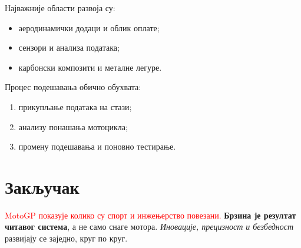 \documentclass[12pt,a4paper]{article}
\begin{document}
Најважније области развоја су:
\begin{itemize}[label=--]
\item аеродинамички додаци и облик оплате;
\item сензори и анализа података;
\item карбонски композити и металне легуре.
\end{itemize}
Процес подешавања обично обухвата:
\begin{enumerate}
\item прикупљање података на стази;
\item анализу понашања мотоцикла;
\item промену подешавања и поновно тестирање.
\end{enumerate}

\section{Закључак}
\textcolor{red}{MotoGP показује колико су спорт и инжењерство повезани.} \textbf{Брзина је резултат читавог система}, а не само снаге мотора. \textit{Иновације, прецизност и безбедност} развијају се заједно, круг по круг.
\end{document}
